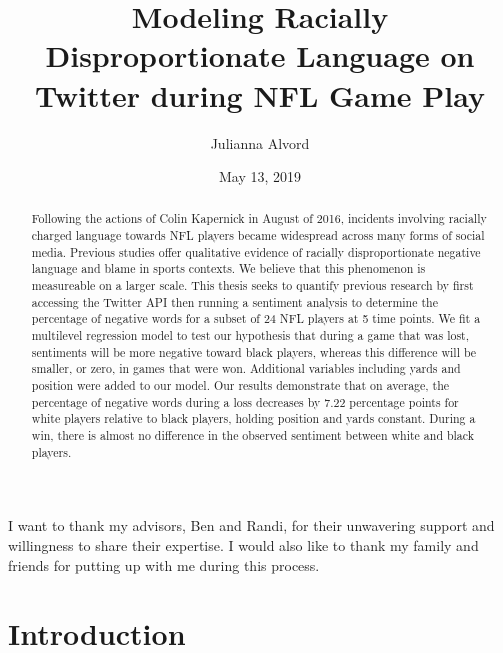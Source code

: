 \documentclass[12pt,twoside]{reedthesis}
\title{Modeling Racially Disproportionate Language on Twitter during NFL Game
Play}
\author{Julianna Alvord}
\date{May 13, 2019}
\begin{document}
  \maketitle

\frontmatter %
\pagestyle{empty} %
  \begin{acknowledgements}
    I want to thank my advisors, Ben and Randi, for their unwavering support
    and willingness to share their expertise. I would also like to thank my
    family and friends for putting up with me during this process.
  \end{acknowledgements}

  \hypersetup{linkcolor=black}
  \setcounter{tocdepth}{2}
  \tableofcontents

  \listoftables

  \listoffigures
  \begin{abstract}
    Following the actions of Colin Kapernick in August of 2016, incidents
    involving racially charged language towards NFL players became
    widespread across many forms of social media. Previous studies offer
    qualitative evidence of racially disproportionate negative language and
    blame in sports contexts. We believe that this phenomenon is measureable
    on a larger scale. This thesis seeks to quantify previous research by
    first accessing the Twitter API then running a sentiment analysis to
    determine the percentage of negative words for a subset of 24 NFL
    players at 5 time points. We fit a multilevel regression model to test
    our hypothesis that during a game that was lost, sentiments will be more
    negative toward black players, whereas this difference will be smaller,
    or zero, in games that were won. Additional variables including yards
    and position were added to our model. Our results demonstrate that on
    average, the percentage of negative words during a loss decreases by
    7.22 percentage points for white players relative to black players,
    holding position and yards constant. During a win, there is almost no
    difference in the observed sentiment between white and black players.
  \end{abstract}

\mainmatter %
\pagestyle{fancyplain} %

\chapter{Introduction}\label{intro}
\end{document}
